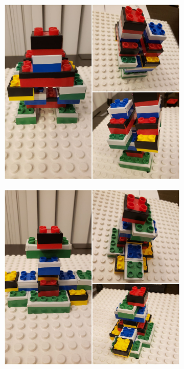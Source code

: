 \begin{figure}[H]
    \begin{subfigure}{0.5\textwidth}
       \centering
       \includegraphics[width=0.8\linewidth]{figures/e3.jpg}
       
       \caption[{}]{\label{fig:fig_3-7a}}
    \end{subfigure}
    \begin{subfigure}{0.5\textwidth}
       \centering
       \includegraphics[width=0.8\linewidth]{figures/e4.jpg}
       

\end{subfigure}
\end{figure}

